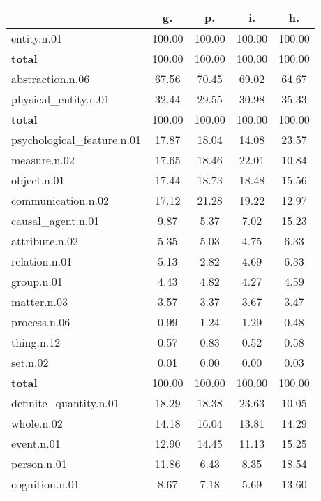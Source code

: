 \begin{table}[h!]
\begin{center}
\begin{tabular}{| l || c | c | c | c |}\hline
 & {\bf g.} & {\bf p.} & {\bf i.} & {\bf h.} \\\hline\hline
entity.n.01 & 100.00  & 100.00  & 100.00  & 100.00 \\\hline\hline
{{\bf total}} & 100.00  & 100.00  & 100.00  & 100.00 \\\hline\hline\hline
abstraction.n.06 & 67.56  & 70.45  & 69.02  & 64.67 \\\hline
physical\_entity.n.01 & 32.44  & 29.55  & 30.98  & 35.33 \\\hline\hline
{{\bf total}} & 100.00  & 100.00  & 100.00  & 100.00 \\\hline\hline\hline
psychological\_feature.n.01 & 17.87  & 18.04  & 14.08  & 23.57 \\\hline
measure.n.02 & 17.65  & 18.46  & 22.01  & 10.84 \\\hline
object.n.01 & 17.44  & 18.73  & 18.48  & 15.56 \\\hline
communication.n.02 & 17.12  & 21.28  & 19.22  & 12.97 \\\hline
causal\_agent.n.01 & 9.87  & 5.37  & 7.02  & 15.23 \\\hline
attribute.n.02 & 5.35  & 5.03  & 4.75  & 6.33 \\\hline
relation.n.01 & 5.13  & 2.82  & 4.69  & 6.33 \\\hline
group.n.01 & 4.43  & 4.82  & 4.27  & 4.59 \\\hline
matter.n.03 & 3.57  & 3.37  & 3.67  & 3.47 \\\hline
process.n.06 & 0.99  & 1.24  & 1.29  & 0.48 \\\hline
thing.n.12 & 0.57  & 0.83  & 0.52  & 0.58 \\\hline
set.n.02 & 0.01  & 0.00  & 0.00  & 0.03 \\\hline\hline
{{\bf total}} & 100.00  & 100.00  & 100.00  & 100.00 \\\hline\hline\hline
definite\_quantity.n.01 & 18.29  & 18.38  & 23.63  & 10.05 \\\hline
whole.n.02 & 14.18  & 16.04  & 13.81  & 14.29 \\\hline
event.n.01 & 12.90  & 14.45  & 11.13  & 15.25 \\\hline
person.n.01 & 11.86  & 6.43  & 8.35  & 18.54 \\\hline
cognition.n.01 & 8.67  & 7.18  & 5.69  & 13.60 \\\hline

\end{tabular}
\end{center}
\end{table}
